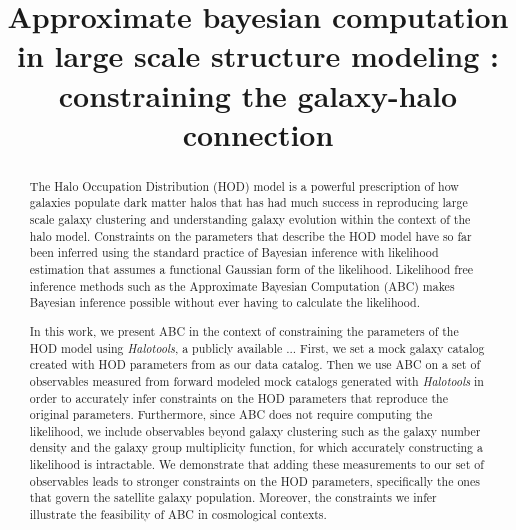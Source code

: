 \title{Approximate bayesian computation in large scale structure modeling : constraining the galaxy-halo connection}
\begin{abstract}
 The Halo Occupation Distribution (HOD) model is a powerful prescription of how galaxies
populate dark matter halos that has had much success in reproducing large scale galaxy
clustering and understanding galaxy evolution within the context of the halo model.
Constraints on the parameters that describe the HOD model have so far been inferred using 
the standard practice of Bayesian inference with likelihood estimation that assumes a
functional Gaussian form of the likelihood.  %
Likelihood free inference methods such as the
Approximate Bayesian Computation (ABC) makes Bayesian inference possible without ever 
having to calculate the likelihood. 

In this work, we present ABC in the context of constraining the parameters of the HOD model
using {\it Halotools}, a publicly available ... First, we set a mock galaxy catalog created
with HOD parameters from \cite{Zheng:2007aa}  as our data catalog. Then we use ABC on a set 
of observables measured from forward modeled mock catalogs generated with {\it Halotools} 
in order to accurately infer constraints on the HOD parameters that 
reproduce the original parameters.  Furthermore, since ABC does 
not require computing the likelihood, we include observables beyond galaxy clustering 
such as the galaxy number density and the galaxy group multiplicity function, for which
accurately constructing a likelihood is intractable. 
We demonstrate that adding these measurements to our set of observables leads to stronger
constraints on the HOD parameters, specifically the ones that govern the satellite galaxy
population. Moreover, the constraints we infer illustrate the feasibility of ABC in 
cosmological contexts.


\end{abstract}

